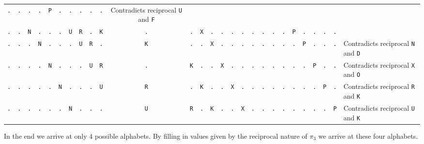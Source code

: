 \begin{center}
{\begin{tabular}{|*{26}{c|}l|}
      \texttt{.} & \texttt{.} & \texttt{.} & \texttt{.} &
      \texttt{P} & \texttt{.} & \texttt{.} & \texttt{.} &
      \texttt{.} & \texttt{.} & \;\;Contradicts reciprocal
      \texttt{U} and \texttt{F} \\
      \texttt{.} & \texttt{.} & \texttt{N} & \texttt{.} &
      \texttt{.} & \texttt{.} & \texttt{U} & \texttt{R} &
      \texttt{.} & \texttt{K} & \texttt{.} & \texttt{.} &
      \texttt{X} & \texttt{.} & \texttt{.} & \texttt{.} &
      \texttt{.} & \texttt{.} & \texttt{.} & \texttt{.} &
      \texttt{.} & \texttt{P} & \texttt{.} & \texttt{.} &
      \texttt{.} & \texttt{.} & \;\;{\bf{Possible}}
      \\
      \texttt{.} & \texttt{.} & \texttt{.} & \texttt{N} &
      \texttt{.} & \texttt{.} & \texttt{.} & \texttt{U} &
      \texttt{R} & \texttt{.} & \texttt{K} & \texttt{.} &
      \texttt{.} & \texttt{X} & \texttt{.} & \texttt{.} &
      \texttt{.} & \texttt{.} & \texttt{.} & \texttt{.} &
      \texttt{.} & \texttt{.} & \texttt{P} & \texttt{.} &
      \texttt{.} & \texttt{.} & \;\;Contradicts reciprocal
      \texttt{N} and \texttt{D} \\
      \texttt{.} & \texttt{.} & \texttt{.} & \texttt{.} &
      \texttt{N} & \texttt{.} & \texttt{.} & \texttt{.} &
      \texttt{U} & \texttt{R} & \texttt{.} & \texttt{K} &
      \texttt{.} & \texttt{.} & \texttt{X} & \texttt{.} &
      \texttt{.} & \texttt{.} & \texttt{.} & \texttt{.} &
      \texttt{.} & \texttt{.} & \texttt{.} & \texttt{P} &
      \texttt{.} & \texttt{.} & \;\;Contradicts reciprocal
      \texttt{X} and \texttt{O} \\
      \texttt{.} & \texttt{.} & \texttt{.} & \texttt{.} &
      \texttt{.} & \texttt{N} & \texttt{.} & \texttt{.} &
      \texttt{.} & \texttt{U} & \texttt{R} & \texttt{.} &
      \texttt{K} & \texttt{.} & \texttt{.} & \texttt{X} &
      \texttt{.} & \texttt{.} & \texttt{.} & \texttt{.} &
      \texttt{.} & \texttt{.} & \texttt{.} & \texttt{.} &
      \texttt{P} & \texttt{.} & \;\;Contradicts reciprocal
      \texttt{R} and \texttt{K} \\
      \texttt{.} & \texttt{.} & \texttt{.} & \texttt{.} &
      \texttt{.} & \texttt{.} & \texttt{N} & \texttt{.} &
      \texttt{.} & \texttt{.} & \texttt{U} & \texttt{R} &
      \texttt{.} & \texttt{K} & \texttt{.} & \texttt{.} &
      \texttt{X} & \texttt{.} & \texttt{.} & \texttt{.} &
      \texttt{.} & \texttt{.} & \texttt{.} & \texttt{.} &
      \texttt{.} & \texttt{P} & \;\;Contradicts reciprocal
      \texttt{U} and \texttt{K} \\
      \hline
  \end{tabular}}
\end{center}
\noindent In the end we arrive at only $4$ possible alphabets. By
filling in values given by the reciprocal nature of $\pi_3$ we
arrive at these four alphabets.
\setlength{\tabcolsep}{3pt}
\renewcommand{\arraystretch}{1.1}

